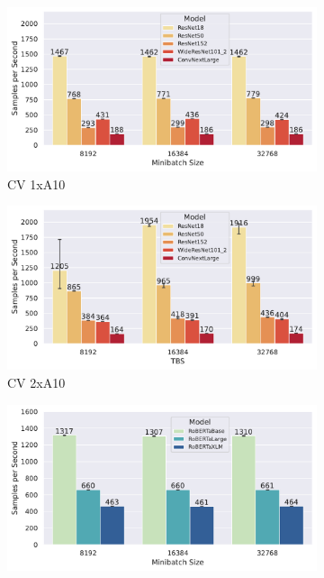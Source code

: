 \begin{figure}
    \begin{subfigure}[c]{0.23\textwidth}
        \includegraphics[width=\textwidth]{figures/misc/cv_1xa10_all-tbs_baseline}
        \vspace{-18pt}
        \caption{CV 1xA10}
        \label{fig:cv-1xa10-baseline}
    \end{subfigure}
    \begin{subfigure}[c]{0.23\textwidth}
        \includegraphics[width=\textwidth]{figures/misc/cv_2xa10_all-tbs_hivemind}
        \vspace{-18pt}
        \caption{CV 2xA10}
        \label{fig:cv-2xa10-hivemind}
    \end{subfigure}
        \begin{subfigure}[c]{0.23\textwidth}
        \includegraphics[width=\textwidth]{figures/misc/nlp_1xa10_all-tbs_baseline}

\end{subfigure}
\end{figure}
